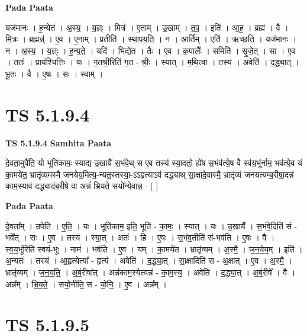 \documentclass[17pt]{extarticle}
\begin{document}
\textbf{Pada Paata} \newline

यज॑मानः । ह॒न्येत॑ । अ॒स्य॒ । य॒ज्ञ्ः । मित्र॑ । ए॒ताम् । उ॒खाम् । त॒प॒ । इति॑ । आ॒ह॒ । ब्रह्म॑ । वै । मि॒त्रः । ब्रह्मन्न्॑ । ए॒व । ए॒ना॒म् । प्रतीति॑ । स्था॒प॒य॒ति॒ । न । आर्ति᳚म् । एति॑ । ऋ॒च्छ॒ति॒ । यज॑मानः । न । अ॒स्य॒ । य॒ज्ञ्ः । ह॒न्य॒ते॒ । यदि॑ । भिद्ये॑त । तैः । ए॒व । क॒पालैः᳚ । समिति॑ । सृ॒जे॒त् । सा । ए॒व । ततः॑ । प्राय॑श्चित्तिः । यः । ग॒तश्री॒रिति॑ ग॒त - श्रीः॒ । स्यात् । म॒थि॒त्वा । तस्य॑ । अवेति॑ । द॒द्ध्या॒त् । भू॒तः । वै । ए॒षः । सः । स्वाम् ।  \newline




\section*{ TS 5.1.9.4 }

\textbf{TS 5.1.9.4 } \newline
\textbf{Samhita Paata} \newline

दे॒वता॒मुपै॑ति॒ यो भूति॑कामः॒ स्याद्य उ॒खायै॑ स॒भंवे॒थ् स ए॒व तस्य॑ स्या॒दतो॒ ह्ये॑ष स॒भंव॑त्ये॒ष वै स्व॑य॒भूंर्नाम॒ भव॑त्ये॒व यं का॒मये॑त॒ भ्रातृ॑व्यमस्मै जनयेय॒मित्य॒-न्यत॒स्तस्या॒-ऽऽहृत्याऽव॑ दद्ध्याथ् सा॒क्षादे॒वास्मै॒ भ्रातृ॑व्यं जनयत्यम्ब॒रीषा॒दन्न॑ काम॒स्याव॑ दद्ध्यादंब॒रीषे॒ वा अन्नं॑ भ्रियते॒ सयो᳚न्ये॒वान्न॒ - [  ] \newline

\textbf{Pada Paata} \newline

दे॒वता᳚म् । उपेति॑ । ए॒ति॒ । यः । भूति॑काम॒ इति॒ भूति॑ - का॒मः॒ । स्यात् । यः । उ॒खायै᳚ । स॒भंवे॒दिति॑ सं - भवे᳚त् । सः । ए॒व । तस्य॑ । स्या॒त् । अतः॑ । हि । ए॒षः । स॒भंव॒तीति॑ सं-भव॑ति । ए॒षः । वै । स्व॒य॒भूंरिति॑ स्वयं-भूः । नाम॑ । भव॑ति । ए॒व । यम् । का॒मये॑त । भ्रातृ॑व्यम् । अ॒स्मै॒ । ज॒न॒ये॒य॒म् । इति॑ । अ॒न्यतः॑ । तस्य॑ । आ॒हृत्येत्या᳚ - हृत्य॑ । अवेति॑ । द॒द्ध्या॒त् । सा॒क्षादिति॑ स - अ॒क्षात् । ए॒व । अ॒स्मै॒ । भ्रातृ॑व्यम् । ज॒न॒य॒ति॒ । अ॒बं॒रीषा᳚त् । अन्न॑काम॒स्येत्यन्न॑ - का॒म॒स्य॒ । अवेति॑ । द॒द्ध्या॒त् । अ॒बं॒रीषे᳚ । वै । अन्न᳚म् । भ्रि॒य॒ते॒ । सयो॒नीति॒ स - यो॒नि॒ । ए॒व । अन्न᳚म् ।  \newline




\section*{ TS 5.1.9.5 }
\end{document}
